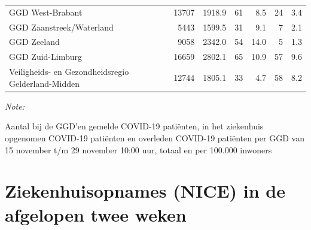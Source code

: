 \documentclass[
  english,
  man,floatsintext]{apa6}
\begin{document}
\begin{table}
\begin{threeparttable}
\begin{tabular}{lrrrrrr}
GGD West-Brabant & 13707 & 1918.9 & 61 & 8.5 & 24 & 3.4\\
GGD Zaanstreek/Waterland & 5443 & 1599.5 & 31 & 9.1 & 7 & 2.1\\
GGD Zeeland & 9058 & 2342.0 & 54 & 14.0 & 5 & 1.3\\
GGD Zuid-Limburg & 16659 & 2802.1 & 65 & 10.9 & 57 & 9.6\\
Veiligheids- en Gezondheidsregio Gelderland-Midden & 12744 & 1805.1 & 33 & 4.7 & 58 & 8.2\\
\bottomrule
\end{tabular}
\begin{tablenotes}
\item \textit{Note: } 
\item Aantal bij de GGD’en gemelde COVID-19 patiënten, in het ziekenhuis opgenomen COVID-19 patiënten en overleden COVID-19 patiënten per GGD van 15 november t/m 29 november 10:00 uur, totaal en per 100.000 inwoners
\end{tablenotes}
\end{threeparttable}
\endgroup{}
\end{table}

\newpage

\hypertarget{ziekenhuisopnames-nice-in-de-afgelopen-twee-weken}{%
\section{Ziekenhuisopnames (NICE) in de afgelopen twee weken}\label{ziekenhuisopnames-nice-in-de-afgelopen-twee-weken}}
\end{document}
